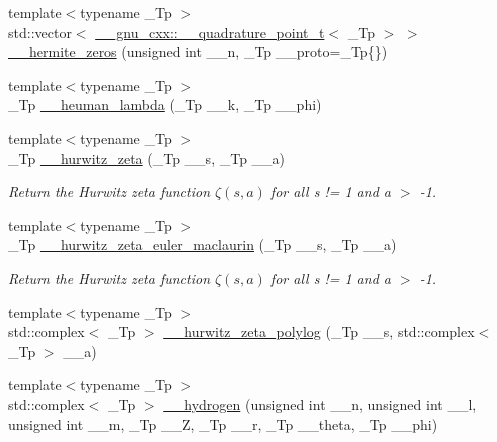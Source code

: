 \begin{DoxyCompactItemize}
{\footnotesize template$<$typename \+\_\+\+Tp $>$ }\\std\+::vector$<$ \hyperlink{struct____gnu__cxx_1_1____quadrature__point__t}{\+\_\+\+\_\+gnu\+\_\+cxx\+::\+\_\+\+\_\+quadrature\+\_\+point\+\_\+t}$<$ \+\_\+\+Tp $>$ $>$ \hyperlink{namespacestd_1_1____detail_a34e064cf8ddf0680ce559ba3f976c6dd}{\+\_\+\+\_\+hermite\+\_\+zeros} (unsigned int \+\_\+\+\_\+n, \+\_\+\+Tp \+\_\+\+\_\+proto=\+\_\+\+Tp\{\})
\item 
{\footnotesize template$<$typename \+\_\+\+Tp $>$ }\\\+\_\+\+Tp \hyperlink{namespacestd_1_1____detail_a90938823a16cabc06031ebf209066a94}{\+\_\+\+\_\+heuman\+\_\+lambda} (\+\_\+\+Tp \+\_\+\+\_\+k, \+\_\+\+Tp \+\_\+\+\_\+phi)
\item 
{\footnotesize template$<$typename \+\_\+\+Tp $>$ }\\\+\_\+\+Tp \hyperlink{namespacestd_1_1____detail_a63aafed798ada71b2cc58e84a6652169}{\+\_\+\+\_\+hurwitz\+\_\+zeta} (\+\_\+\+Tp \+\_\+\+\_\+s, \+\_\+\+Tp \+\_\+\+\_\+a)
\begin{DoxyCompactList}\small\item\em Return the Hurwitz zeta function $ \zeta(s,a) $ for all s != 1 and a $>$ -\/1. \end{DoxyCompactList}\item 
{\footnotesize template$<$typename \+\_\+\+Tp $>$ }\\\+\_\+\+Tp \hyperlink{namespacestd_1_1____detail_a56c55858723fe9e0c541f0e77572b58d}{\+\_\+\+\_\+hurwitz\+\_\+zeta\+\_\+euler\+\_\+maclaurin} (\+\_\+\+Tp \+\_\+\+\_\+s, \+\_\+\+Tp \+\_\+\+\_\+a)
\begin{DoxyCompactList}\small\item\em Return the Hurwitz zeta function $ \zeta(s,a) $ for all s != 1 and a $>$ -\/1. \end{DoxyCompactList}\item 
{\footnotesize template$<$typename \+\_\+\+Tp $>$ }\\std\+::complex$<$ \+\_\+\+Tp $>$ \hyperlink{namespacestd_1_1____detail_a7c45415c3ec0e137eea2364a6dd3af4e}{\+\_\+\+\_\+hurwitz\+\_\+zeta\+\_\+polylog} (\+\_\+\+Tp \+\_\+\+\_\+s, std\+::complex$<$ \+\_\+\+Tp $>$ \+\_\+\+\_\+a)
\item 
{\footnotesize template$<$typename \+\_\+\+Tp $>$ }\\std\+::complex$<$ \+\_\+\+Tp $>$ \hyperlink{namespacestd_1_1____detail_aba60bcf9f002dc900042065999546bc9}{\+\_\+\+\_\+hydrogen} (unsigned int \+\_\+\+\_\+n, unsigned int \+\_\+\+\_\+l, unsigned int \+\_\+\+\_\+m, \+\_\+\+Tp \+\_\+\+\_\+Z, \+\_\+\+Tp \+\_\+\+\_\+r, \+\_\+\+Tp \+\_\+\+\_\+theta, \+\_\+\+Tp \+\_\+\+\_\+phi)

\end{DoxyCompactItemize}
